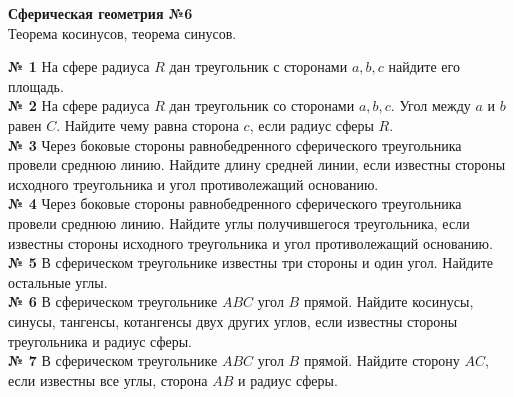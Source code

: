 


    \begin{center}
        \textbf{Сферическая геометрия №6}\\
        Теорема косинусов, теорема синусов.
    \end{center}


    \textbf{№ 1}
    На сфере радиуса $R$ дан треугольник с сторонами $a, b, c$ найдите его площадь.\\


    \textbf{№ 2}
    На сфере радиуса $R$ дан треугольник со сторонами $a, b, c$.
    Угол между $a$ и $b$ равен $C$.
    Найдите чему равна сторона $c$, если радиус сферы $R$.\\


    \textbf{№ 3}
    Через боковые стороны равнобедренного сферического треугольника провели среднюю линию.
    Найдите длину средней линии, если известны стороны исходного треугольника и угол противолежащий основанию.\\


    \textbf{№ 4}
    Через боковые стороны равнобедренного сферического треугольника провели среднюю линию.
    Найдите углы получившегося треугольника, если известны стороны исходного треугольника и угол противолежащий основанию.\\


    \textbf{№ 5}
    В сферическом треугольнике известны три стороны и один угол.
    Найдите остальные углы.\\


    \textbf{№ 6}
    В сферическом треугольнике $ABC$ угол $B$ прямой.
    Найдите косинусы, синусы, тангенсы, котангенсы двух других углов,
    если известны стороны треугольника и радиус сферы.\\


    \textbf{№ 7}
    В сферическом треугольнике $ABC$ угол $B$ прямой.
    Найдите сторону $AC$, если известны все углы, сторона $AB$ и радиус сферы.



